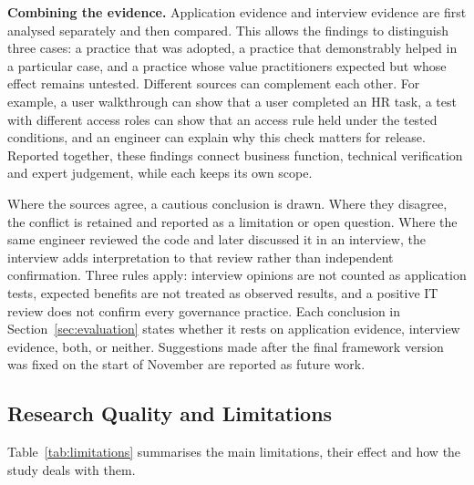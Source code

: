 \documentclass[10pt,a4paper]{article}
\begin{document}
\textbf{Combining the evidence.} Application evidence and interview
evidence are first analysed separately and then compared. This allows
the findings to distinguish three cases: a practice that was adopted, a
practice that demonstrably helped in a particular case, and a practice
whose value practitioners expected but whose effect remains untested.
Different sources can complement each other. For example, a user
walkthrough can show that a user completed an HR task, a test with
different access roles can show that an access rule held under the
tested conditions, and an engineer can explain why this check matters
for release. Reported together, these findings connect business
function, technical verification and expert judgement, while each keeps
its own scope.
 
Where the sources agree, a cautious conclusion is drawn. Where they
disagree, the conflict is retained and reported as a limitation or open
question. Where the same engineer reviewed the code and later discussed
it in an interview, the interview adds interpretation to that review
rather than independent confirmation. Three rules apply: interview
opinions are not counted as application tests, expected benefits are
not treated as observed results, and a positive IT review does not
confirm every governance practice. Each conclusion in
Section~\ref{sec:evaluation} states whether it rests on application
evidence, interview evidence, both, or neither. Suggestions made after
the final framework version was fixed on the start of November are reported as future
work.
 
 
\subsection{Research Quality and Limitations}
\label{sec:method-limitations}
 
Table~\ref{tab:limitations} summarises the main limitations, their
effect and how the study deals with them.
 
\end{document}
